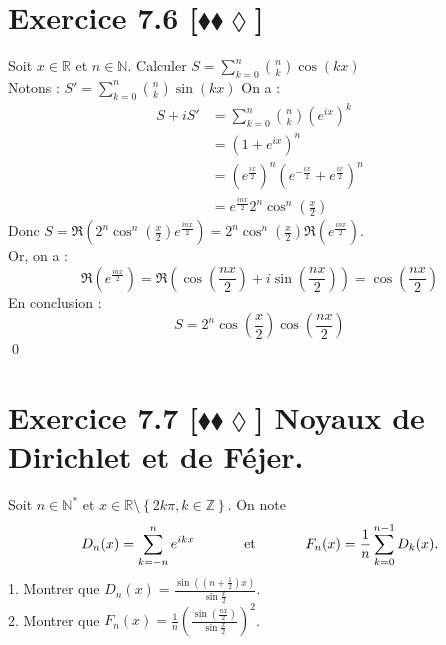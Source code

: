 \documentclass[10pt]{article}
\begin{document}

\section*{Exercice 7.6 [$\blacklozenge\blacklozenge\lozenge$]}
\begin{tcolorbox}[enhanced, width=7in, center, size=fbox, fontupper=\large, drop shadow southwest]
    Soit $x\in\mathbb{R}$ et $n\in\mathbb{N}$. Calculer $S=\sum\limits_{k=0}^{n}{\binom{n}{k}\cos(kx)}$\\
    Notons : $S'=\sum\limits_{k=0}^{n}{\binom{n}{k}\sin(kx)}$
    On a :
    \begin{align*}
        S + iS' &= \sum_{k=0}^{n}{\binom{n}{k}\left(e^{ix}\right)^k}\\
        &= (1 + e^{ix})^n\\
        &= \left( e^{\frac{ix}{2}} \right)^n\left( e^{-\frac{ix}{2}} + e^{\frac{ix}{2}}\right)^n\\
        &= e^{\frac{inx}{2}}2^n\cos^n\left(\frac{x}{2}\right)
    \end{align*}
    Donc $S = \Re\left( 2^n\cos^n\left( \frac{x}{2} \right)e^{\frac{inx}{2}} \right) = 2^n\cos^n\left( \frac{x}{2} \right)\Re\left( e^{\frac{inx}{2}} \right)$.\\
    Or, on a :
    \begin{equation*}
        \Re\left( e^{\frac{inx}{2}} \right) = \Re\left( \cos\left(\frac{nx}{2}\right) + i\sin\left(\frac{nx}{2}\right) \right) = \cos\left( \frac{nx}{2} \right)
    \end{equation*}
    En conclusion :
    \begin{equation*}
        S = 2^n \cos\left( \frac{x}{2} \right)\cos\left(\frac{nx}{2}\right)
    \end{equation*}
    \qed
\end{tcolorbox}


\section*{Exercice 7.7 [$\blacklozenge\blacklozenge\lozenge$] Noyaux de Dirichlet et de Féjer.}
\begin{tcolorbox}[enhanced, width=7in, center, size=fbox, fontupper=\large, drop shadow southwest]
    Soit $n\in\mathbb{N}^*$ et $x\in\mathbb{R} \setminus \left\{ 2k\pi, k\in\mathbb{Z} \right\}$. On note
    \begin{equation*}
        D_n(x) = \sum_{k=-n}^{n}{e^{ikx}} \hspace{1.25cm} \text{et} \hspace{1.25cm} F_n(x) = \frac{1}{n}\sum_{k=0}^{n-1}{D_k(x)}.
    \end{equation*}
    1. Montrer que $D_n(x)=\frac{\sin\left( (n+\frac{1}{2})x \right)}{\sin\frac{x}{2}}$.\\
    2. Montrer que $F_n(x)=\frac{1}{n}\left( \frac{\sin\left( \frac{nx}{2} \right)}{\sin\frac{x}{2}} \right)^2$.
\end{tcolorbox}

\end{document}
